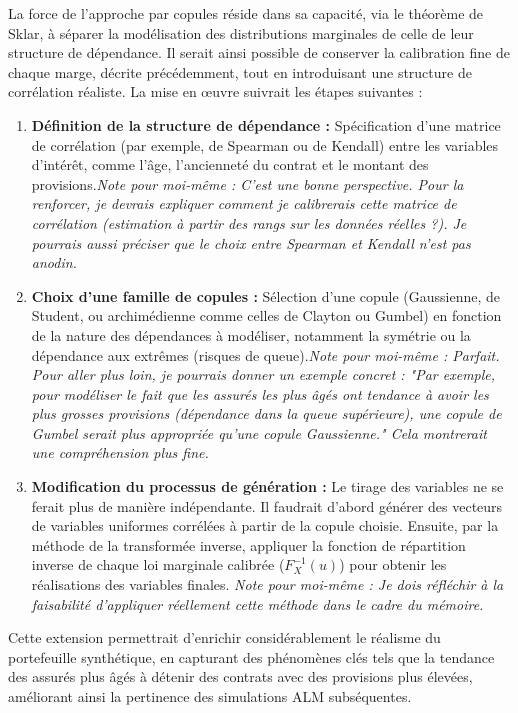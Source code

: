La force de l'approche par copules réside dans sa capacité, via le théorème de Sklar, à séparer la modélisation des distributions marginales de celle de leur structure de dépendance. Il serait ainsi possible de conserver la calibration fine de chaque marge, décrite précédemment, tout en introduisant une structure de corrélation réaliste. La mise en œuvre suivrait les étapes suivantes :
\begin{enumerate}
    \item \textbf{Définition de la structure de dépendance :} Spécification d'une matrice de corrélation (par exemple, de Spearman ou de Kendall) entre les variables d'intérêt, comme l'âge, l'ancienneté du contrat et le montant des provisions.\textit{Note pour moi-même : C'est une bonne perspective. Pour la renforcer, je devrais expliquer comment je calibrerais cette matrice de corrélation (estimation à partir des rangs sur les données réelles ?). Je pourrais aussi préciser que le choix entre Spearman et Kendall n'est pas anodin.}
    \item \textbf{Choix d'une famille de copules :} Sélection d'une copule (Gaussienne, de Student, ou archimédienne comme celles de Clayton ou Gumbel) en fonction de la nature des dépendances à modéliser, notamment la symétrie ou la dépendance aux extrêmes (risques de queue).\textit{Note pour moi-même : Parfait. Pour aller plus loin, je pourrais donner un exemple concret : "Par exemple, pour modéliser le fait que les assurés les plus âgés ont tendance à avoir les plus grosses provisions (dépendance dans la queue supérieure), une copule de Gumbel serait plus appropriée qu'une copule Gaussienne." Cela montrerait une compréhension plus fine.}
    \item \textbf{Modification du processus de génération :} Le tirage des variables ne se ferait plus de manière indépendante. Il faudrait d'abord générer des vecteurs de variables uniformes corrélées à partir de la copule choisie. Ensuite, par la méthode de la transformée inverse, appliquer la fonction de répartition inverse de chaque loi marginale calibrée ($F_X^{-1}(u)$) pour obtenir les réalisations des variables finales. \textit{Note pour moi-même : Je dois réfléchir à la faisabilité d'appliquer réellement cette méthode dans le cadre du mémoire.}
\end{enumerate}

Cette extension permettrait d'enrichir considérablement le réalisme du portefeuille synthétique, en capturant des phénomènes clés tels que la tendance des assurés plus âgés à détenir des contrats avec des provisions plus élevées, améliorant ainsi la pertinence des simulations ALM subséquentes.
